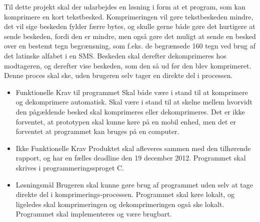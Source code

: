 Til dette projekt skal der udarbejdes en løsning i form at et program, som kan komprimere en kort tekstbesked. Komprimeringen vil gøre tekstbeskeden mindre, det vil sige beskeden fylder færre bytes, og skulle gerne både gøre det hurtigere at sende beskeden, fordi den er mindre, men også gøre det muligt at sende en besked over en bestemt tegn begrænsning, som f.eks. de begrænsede 160 tegn ved brug af det latinske alfabet i en SMS. Beskeden skal derefter dekomprimeres hos modtageren, og derefter vise beskeden, som den så ud før den blev komprimeret. Denne proces skal ske, uden brugeren selv tager en direkte del i processen.

\begin {itemize}
\item Funktionelle Krav til programmet
\subitem Skal både være i stand til at komprimere og dekomprimere automatisk.
\subitem Skal være i stand til at skelne mellem hvorvidt den pågældende besked skal komprimeres eller dekomprimeres.
\subitem Det er ikke forventet, at prototypen skal kunne køre på en mobil enhed, men det er forventet at programmet kan bruges på en computer.

\item Ikke Funktionelle Krav
\subitem Produktet skal afleveres sammen med den tilhørende rapport, og har en fælles deadline den 19 december 2012.
\subitem Programmet skal skrives i programmeringssproget C.

\item Løsningsmål
\subitem Brugeren skal kunne gøre brug af programmet uden selv at tage direkte del i komprimerings-processen.
\subitem Programmet skal køre lokalt, og ligeledes skal komprimeringen og dekomprimeringen også ske lokalt.
\subitem Programmet skal implementeres og være brugbart.
\end{itemize}
